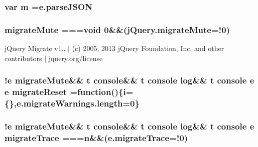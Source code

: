 \hypertarget{jquery-migrate-1_82_81_8min_8js_a9e77e016b2928d7dcb493b89a0c9dc32}{
\subsubsection[{m}]{\setlength{\rightskip}{0pt plus 5cm}var m ={\bf e.\-parse\-J\-S\-O\-N}}}\label{jquery-migrate-1_82_81_8min_8js_a9e77e016b2928d7dcb493b89a0c9dc32}
\hypertarget{jquery-migrate-1_82_81_8min_8js_ae195c77203e798bee6ede6c8c76c56ae}{
\subsubsection[{migrate\-Mute}]{ migrate\-Mute ===void 0\&\&(j\-Query.\-migrate\-Mute=!0)}}\label{jquery-migrate-1_82_81_8min_8js_ae195c77203e798bee6ede6c8c76c56ae}
j\-Query Migrate v1.. $\vert$ (c) 2005, 2013 j\-Query Foundation, Inc. and other contributors $\vert$ jquery.\-org/license \hypertarget{jquery-migrate-1_82_81_8min_8js_ad5132c36e337c6103a95a3d355e6c4a5}{
\subsubsection[{migrate\-Reset}]{ !{\bf e} {\bf migrate\-Mute}\&\& {\bf t} console\&\& {\bf t} console {\bf log}\&\& {\bf t} console {\bf e} {\bf e} migrate\-Reset =function()\{{\bf i}=\{\},e.\-migrate\-Warnings.\-length=0\}}}\label{jquery-migrate-1_82_81_8min_8js_ad5132c36e337c6103a95a3d355e6c4a5}
\hypertarget{jquery-migrate-1_82_81_8min_8js_a6965eb7cecccff575d9c9b1a65e4623f}{
\subsubsection[{migrate\-Trace}]{ !{\bf e} {\bf migrate\-Mute}\&\& {\bf t} console\&\& {\bf t} console {\bf log}\&\& {\bf t} console {\bf e} migrate\-Trace ==={\bf n}\&\&(e.\-migrate\-Trace=!0)}}\label{jquery-migrate-1_82_81_8min_8js_a6965eb7cecccff575d9c9b1a65e4623f}
